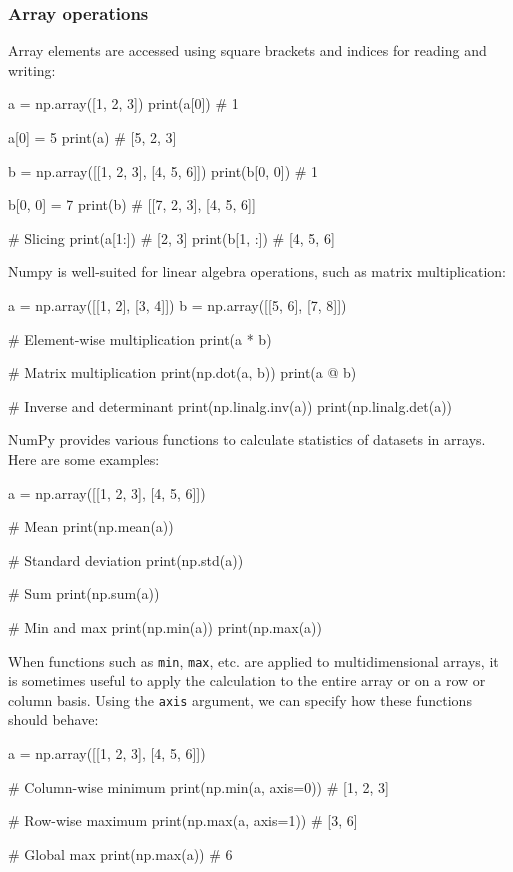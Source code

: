 \subsubsection*{Array operations}

Array elements are accessed using square brackets and indices for reading and writing:
\begin{codeblock}[language=python]
a = np.array([1, 2, 3])
print(a[0])  # 1

a[0] = 5
print(a)  # [5, 2, 3]

b = np.array([[1, 2, 3], [4, 5, 6]])
print(b[0, 0])  # 1

b[0, 0] = 7
print(b)  # [[7, 2, 3], [4, 5, 6]]

# Slicing
print(a[1:])  # [2, 3]
print(b[1, :])  # [4, 5, 6]
\end{codeblock}

Numpy is well-suited for linear algebra operations, such as matrix multiplication:
\begin{codeblock}[language=python]
a = np.array([[1, 2], [3, 4]])
b = np.array([[5, 6], [7, 8]])

# Element-wise multiplication
print(a * b)

# Matrix multiplication
print(np.dot(a, b))
print(a @ b)

# Inverse and determinant
print(np.linalg.inv(a))
print(np.linalg.det(a))
\end{codeblock}

NumPy provides various functions to calculate statistics of datasets in arrays. Here are some
examples:
\begin{codeblock}[language=python]
a = np.array([[1, 2, 3], [4, 5, 6]])

# Mean
print(np.mean(a))

# Standard deviation
print(np.std(a))

# Sum
print(np.sum(a))

# Min and max
print(np.min(a))
print(np.max(a))
\end{codeblock}

When functions such as \texttt{min}, \texttt{max}, etc. are applied to multidimensional arrays, it is sometimes
useful to apply the calculation to the entire array or on a row or column basis. Using the \texttt{axis}
argument, we can specify how these functions should behave:
\begin{codeblock}[language=python]
a = np.array([[1, 2, 3], [4, 5, 6]])

# Column-wise minimum
print(np.min(a, axis=0))  # [1, 2, 3]

# Row-wise maximum
print(np.max(a, axis=1))  # [3, 6]

# Global max
print(np.max(a))  # 6
\end{codeblock}

